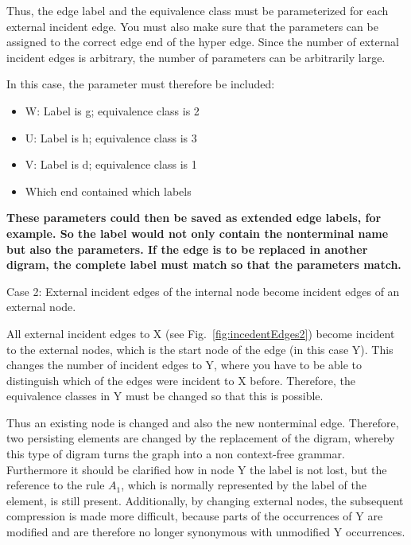 \documentclass[a4paper]{scrartcl}
\newcommand{\asd}[1]{\textbf{#1}}
\begin{document}
Thus, the edge label and the equivalence class must be parameterized for each external incident edge. You must also make sure that the parameters can be assigned to the correct edge end of the hyper edge. Since the number of external incident edges is arbitrary, the number of parameters can be arbitrarily large. 

In this case, the parameter must therefore be included:
\begin{itemize}
\item W: Label is g; equivalence class is 2
\item U: Label is h; equivalence class is 3
\item V: Label is d; equivalence class is 1
\item Which end contained which labels
\end{itemize}
\asd{These parameters could then be saved as extended edge labels, for example. So the label would not only contain the nonterminal name but also the parameters. If the edge is to be replaced in another digram, the complete label must match so that the parameters match.}


Case 2: External incident edges of the internal node become incident edges of an external node. 

All external incident edges to X (see Fig.~\ref{fig:incedentEdges2}) become incident to the external nodes, which is the start node of the edge (in this case Y). This changes the number of incident edges to Y, where you have to be able to distinguish which of the edges were incident to X before. Therefore, the equivalence classes in Y must be changed so that this is possible.

Thus an existing node is changed and also the new nonterminal edge. Therefore, two persisting elements are changed by the replacement of the digram, whereby this type of digram turns the graph into a non context-free grammar. Furthermore it should be clarified how in node Y the label is not lost, but the reference to the rule $A_1$, which is normally represented by the label of the element, is still present. Additionally, by changing external nodes, the subsequent compression is made more difficult, because parts of the occurrences of Y are modified and are therefore no longer synonymous with unmodified Y occurrences.
\end{document}

